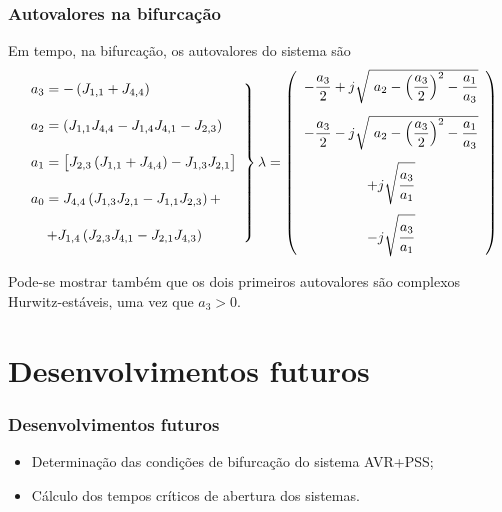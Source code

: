 \documentclass[10pt, compress,xcolor={svgnames,dvipsnames,x11names}]{beamer}
\begin{document}
\begin{frame}%
\frametitle{Autovalores na bifurcação}
\scriptsize

	
	Em tempo, na bifurcação, os autovalores do sistema são
\begin{gather}
\left. \begin{array}{l}
a_3 = - \left( J_{1,1} + J_{4,4} \right) \\[5mm]
%
a_2 = \left( J_{1,1}J_{4,4} - J_{1,4}J_{4,1} - J_{2,3}\right) \\[5mm]
%
a_1 = \left[\strut J_{2,3}\left( J_{1,1} + J_{4,4}\right) - J_{1,3}J_{2,1}\right] \\[5mm]
%
a_0 = J_{4,4}\left( J_{1,3}J_{2,1} - J_{1,1}J_{2,3}\right) + \\[5mm] \hspace{4mm} + J_{1,4}\left( J_{2,3}J_{4,1} - J_{2,1}J_{4,3}\right)
\end{array} \right\}
%
\lambda = \left( \begin{array}{c}
-\dfrac{a_3}{2} + j\sqrt{\strut\ a_2 - \left(\dfrac{a_3}{2} \right)^2 - \dfrac{a_1}{a_3} } \\[5mm]
%
-\dfrac{a_3}{2} - j\sqrt{\strut\ a_2 - \left(\dfrac{a_3}{2} \right)^2 - \dfrac{a_1}{a_3} } \\[5mm]
%
+ j \sqrt{\strut \dfrac{\strut a_3}{a_1}} \\[5mm]
%
- j \sqrt{\strut \dfrac{\strut a_3}{a_1}}
\end{array} \right) \label{eq::autovaloresAVRBifurcacao}
\end{gather}

	Pode-se mostrar também que os dois primeiros autovalores são complexos Hurwitz-estáveis, uma vez que $a_3 > 0$.
\normalsize
\end{frame}%

\section{Desenvolvimentos futuros} %
\begin{frame}%
\frametitle{Desenvolvimentos futuros}
\small

\begin{itemize}
	\item Determinação das condições de bifurcação do sistema AVR+PSS;
%
	\item Cálculo dos tempos críticos de abertura dos sistemas. 
\end{itemize}

\normalsize
\end{frame}%
\end{document}

